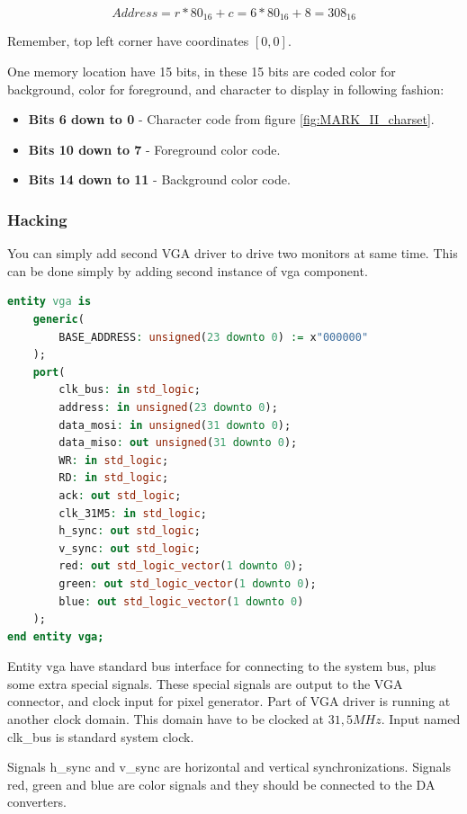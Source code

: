 $$
    Address = r * 80_{16} + c = 6 * 80_{16} + 8 = 308_{16}
$$

Remember, top left corner have coordinates $[0, 0]$.

One memory location have 15 bits, in these 15 bits are coded color for background,
color for foreground, and character to display in following fashion:

\begin{itemize}
    \item \textbf{Bits 6 down to 0} - Character code from figure \ref{fig:MARK_II_charset}.
    \item \textbf{Bits 10 down to 7} - Foreground color code.
    \item \textbf{Bits 14 down to 11} - Background color code.
\end{itemize}

\subsubsection{Hacking}

You can simply add second VGA driver to drive two monitors at same time. This
can be done simply by adding second instance of vga component.

\begin{lstlisting}[language=VHDL, frame=single]
entity vga is
    generic(
        BASE_ADDRESS: unsigned(23 downto 0) := x"000000"
    );
    port(
        clk_bus: in std_logic;
        address: in unsigned(23 downto 0);
        data_mosi: in unsigned(31 downto 0);
        data_miso: out unsigned(31 downto 0);
        WR: in std_logic;
        RD: in std_logic;
        ack: out std_logic;
        clk_31M5: in std_logic;
        h_sync: out std_logic;
        v_sync: out std_logic;
        red: out std_logic_vector(1 downto 0);
        green: out std_logic_vector(1 downto 0);
        blue: out std_logic_vector(1 downto 0)
    );
end entity vga;
\end{lstlisting}

Entity vga have standard bus interface for connecting to the system bus, plus
some extra special signals. These special signals are output to the VGA connector,
and clock input for pixel generator. Part of VGA driver is running at another
clock domain. This domain have to be clocked at $31,5MHz$. Input named clk\_bus
is standard system clock.

Signals h\_sync and v\_sync are horizontal and vertical synchronizations. Signals
red, green and blue are color signals and they should be connected to the DA converters.
